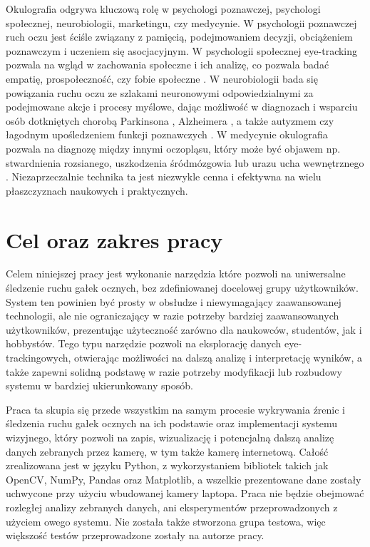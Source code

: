 \documentclass[a4paper,twoside,12pt]{book}
\begin{document}
Okulografia odgrywa kluczową rolę w psychologi poznawczej, psychologi społecznej, neurobiologii, marketingu, czy medycynie. W psychologii poznawczej ruch oczu jest ściśle związany z pamięcią, podejmowaniem decyzji, obciążeniem poznawczym i uczeniem się asocjacyjnym. W psychologii społecznej eye-tracking pozwala na wgląd w zachowania społeczne i ich analizę, co pozwala badać empatię, prospołeczność, czy fobie społeczne \cite{bib:tobii-main}. W neurobiologii bada się powiązania ruchu oczu ze szlakami neuronowymi odpowiedzialnymi za podejmowane akcje i procesy myślowe, dając możliwość w diagnozach i wsparciu osób dotkniętych chorobą Parkinsona \cite{bib:tobii-parkinson}, Alzheimera \cite{bib:tobii-alzheimer}, a także autyzmem czy łagodnym upośledzeniem funkcji poznawczych \cite{bib:tobii-autyzm}. W medycynie okulografia pozwala na diagnozę między innymi oczopląsu, który może być objawem np. stwardnienia rozsianego, uszkodzenia śródmózgowia lub urazu ucha wewnętrznego \cite{bib:Diagnostyka-oczoplas}. Niezaprzeczalnie technika ta jest niezwykle cenna i efektywna na wielu płaszczyznach naukowych i praktycznych.

\section{Cel oraz zakres pracy}
\label{sec:cel-oraz-zakres-pracy}
Celem niniejszej pracy jest wykonanie narzędzia które pozwoli na uniwersalne śledzenie ruchu gałek ocznych, bez zdefiniowanej docelowej grupy użytkowników. System ten powinien być prosty w obsłudze i niewymagający zaawansowanej technologii, ale nie ograniczający w razie potrzeby bardziej zaawansowanych użytkowników, prezentując użyteczność zarówno dla naukowców, studentów, jak i hobbystów. Tego typu narzędzie pozwoli na eksplorację danych eye-trackingowych, otwierając możliwości na dalszą analizę i interpretację wyników, a także zapewni solidną podstawę w razie potrzeby modyfikacji lub rozbudowy systemu w bardziej ukierunkowany sposób.

Praca ta skupia się przede wszystkim na samym procesie wykrywania źrenic i śledzenia ruchu gałek ocznych na ich podstawie oraz implementacji systemu wizyjnego, który pozwoli na zapis, wizualizację i potencjalną dalszą analizę danych zebranych przez kamerę, w tym także kamerę internetową. Całość zrealizowana jest w języku Python, z wykorzystaniem bibliotek takich jak OpenCV, NumPy, Pandas oraz Matplotlib, a wszelkie prezentowane dane zostały uchwycone przy użyciu wbudowanej kamery laptopa. Praca nie będzie obejmować rozległej analizy zebranych danych, ani eksperymentów przeprowadzonych z użyciem owego systemu. Nie została także stworzona grupa testowa, więc większość testów przeprowadzone zostały na autorze pracy.
\end{document}
